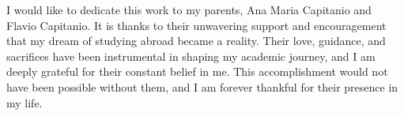 

I would like to dedicate this work to my parents, Ana Maria Capitanio and Flavio Capitanio. It is thanks to their unwavering support and encouragement that my dream of studying abroad became a reality. Their love, guidance, and sacrifices have been instrumental in shaping my academic journey, and I am deeply grateful for their constant belief in me. This accomplishment would not have been possible without them, and I am forever thankful for their presence in my life.

